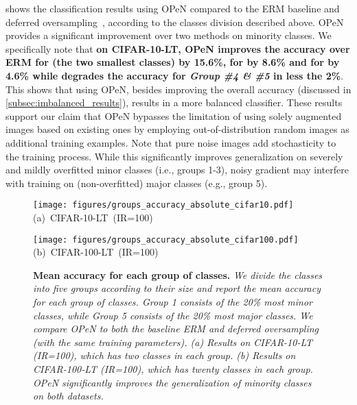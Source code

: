\documentclass[nohyperref]{article}
\theoremstyle{plain}
\theoremstyle{definition}
\theoremstyle{remark}
\begin{document}
 shows the classification results using OPeN compared to the ERM baseline and deferred oversampling~\cite{cao2019learning}, according to the classes division described above. OPeN provides a significant improvement over two methods on minority classes. We specifically note that \textbf{on CIFAR-10-LT, OPeN improves the accuracy over ERM for \textit{} (the two smallest classes) by 15.6\%, for \textit{} by 8.6\% and for \textit{} by  4.6\% while degrades the accuracy for \textit{Group \#4 \& \#5} in less the 2\%}. This shows that using OPeN, besides improving the overall accuracy (discussed in \cref{subsec:imbalanced_results}), results in a more balanced classifier. These results support our claim that OPeN bypasses the limitation of using solely augmented images based on existing ones by employing out-of-distribution random images as additional training examples. Note that pure noise images add stochasticity to the training process. While this significantly improves generalization on severely and mildly overfitted minor classes (i.e., groups 1-3), noisy gradient may interfere with training on (non-overfitted) major classes (e.g., group 5).


\vspace{-0.30cm}
\begin{figure}[h!]
  \centering
  \begin{minipage}[c]{0.48\linewidth}
    \texttt{[image: figures/groups\_accuracy\_absolute\_cifar10.pdf]}
    \centering
    \mbox{\hspace{0.8cm}(a) CIFAR-10-LT (IR=100)}
\end{minipage}
\begin{minipage}[c]{0.48\linewidth}
    \texttt{[image: figures/groups\_accuracy\_absolute\_cifar100.pdf]}
    \centering
    \mbox{\hspace{0.8cm}(b) CIFAR-100-LT (IR=100)}
\end{minipage}
  \vspace*{-0.1cm}
  \caption{\textbf{Mean accuracy for each group of classes.} \textit{We divide the classes into five groups according to their size and report the mean accuracy for each group of classes. Group 1 consists of the 20\% most minor classes, while Group 5 consists of the 20\% most major classes. We compare OPeN to both the baseline ERM and deferred oversampling~\cite{cao2019learning} (with the same training parameters). (a) Results on CIFAR-10-LT (IR=100), which has two classes in each group. (b) Results on CIFAR-100-LT (IR=100), which has twenty classes in each group. OPeN significantly improves the generalization of minority classes on both datasets.}}
  \label{fig:mean_accuracy_per_group}
\end{figure}
\end{document}
